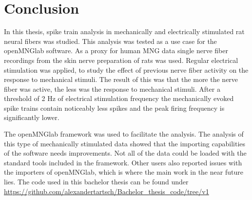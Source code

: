 \chapter{Conclusion}
In this thesis, spike train analysis in mechanically and electrically stimulated rat neural fibers was studied. This analysis was tested as a use case for the openMNGlab software. As a proxy for human MNG data single nerve fiber recordings from the skin nerve preparation of rats was used. Regular electrical stimulation was applied, to study the effect of previous nerve fiber activity on the response to mechanical stimuli. 
The result of this was that the more the nerve fiber was active, the less was the response to mechanical stimuli. After a threshold of 2 Hz of electrical stimulation frequency the mechanically evoked spike trains contain noticeably less spikes and the peak firing frequency is significantly lower.

The openMNGlab framework was used to facilitate the analysis. The analysis of this type of mechanically stimulated data showed that the importing capabilities of the software needs improvements. Not all of the data could be loaded with the standard tools included in the framework. Other users also reported issues with the importers of openMNGlab, which is where the main work in the near future lies. The code used in this bachelor thesis can be found under \url{https://github.com/alexandertartsch/Bachelor_thesis_code/tree/v1}


\cleardoublepage
